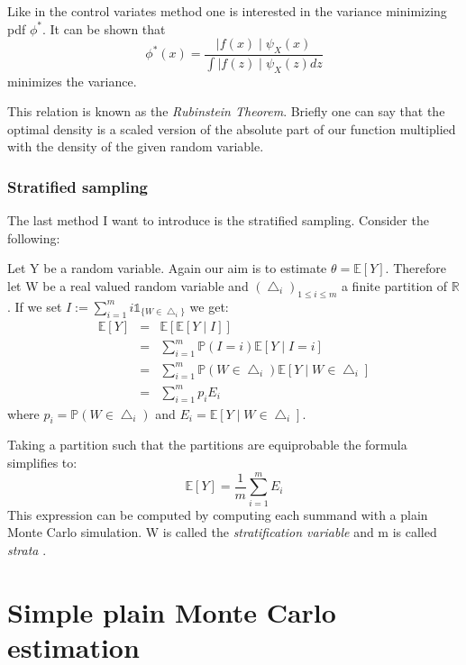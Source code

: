 \documentclass[12pt,a4paper]{scrartcl}
\begin{document}
\noindent Like in the control variates method one is interested in the variance minimizing pdf $\phi^*$. It can be shown that
\[
\phi^*(x) = \frac{\mid f(x) \mid \psi_X(x)} {\int \mid f(z) \mid \psi_X(z) dz}
\]
minimizes the variance. 

\noindent This relation is known as the \emph{Rubinstein Theorem}. Briefly one can say that the optimal density is a scaled version of the absolute part of our function multiplied with the density of the given random variable.

\subsubsection{Stratified sampling}
The last method I want to introduce is the stratified sampling. Consider the following:

\noindent Let Y be a random variable. Again our aim is to estimate $\theta = \mathbb{E}[Y]$. Therefore let W be a real valued random variable and $(\bigtriangleup_i)_{1 \leq i \leq m}$ a finite partition of $\mathbb{R}$.
If we set $I:= \sum_{i=1}^m i \mathds{1}_{ \lbrace W \in \bigtriangleup_i \rbrace }$ we get: 
\begin{eqnarray*}
\mathbb{E}[Y] &=& \mathbb{E} [ \mathbb{E} [Y\mid I ] ] \\
&=& \sum_{i=1}^m \mathbb{P}(I=i) \mathbb{E}[Y\mid I =i] \\
&=& \sum_{i=1}^m \mathbb{P}(W \in \bigtriangleup_i) \mathbb{E}[Y\mid W \in \bigtriangleup_i]\\
&=& \sum_{i=1}^m p_i E_i
\end{eqnarray*}
where  $p_i = \mathbb{P}(W \in \bigtriangleup_i)$ and $E_i = \mathbb{E}[Y\mid W \in \bigtriangleup_i]$.

\noindent Taking a partition such that the partitions are equiprobable the formula simplifies to:
\[
\mathbb{E}[Y] = \frac{1}{m} \sum_{i=1}^m E_i
\]
This expression can be computed by computing each summand with a plain Monte Carlo simulation. W is called the \emph{stratification variable} and m is called \emph{strata}
.
\section{Simple plain Monte Carlo estimation}
\end{document}
